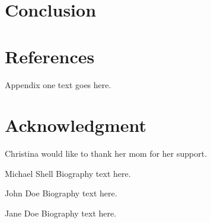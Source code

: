 \documentclass[journal]{IEEEtran}
\begin{document}
\section{Conclusion}

\section{References}

\appendices
Appendix one text goes here.

\section*{Acknowledgment}

Christina would like to thank her mom for her support.

\ifCLASSOPTIONcaptionsoff
  \newpage
\fi


\begin{IEEEbiography}{Michael Shell}
Biography text here.
\end{IEEEbiography}

\begin{IEEEbiographynophoto}{John Doe}
Biography text here.
\end{IEEEbiographynophoto}

\begin{IEEEbiographynophoto}{Jane Doe}
Biography text here.
\end{IEEEbiographynophoto}
\end{document}
